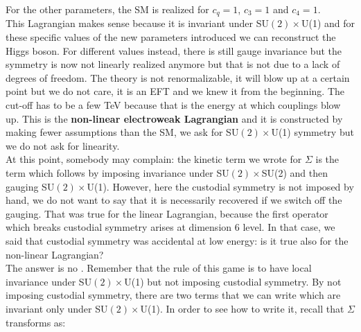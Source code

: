 \documentclass[../main.tex]{subfiles}
\begin{document}
For the other parameters, the SM is realized for $c_q=1$, $c_3=1$ and $c_4=1$.\\
This Lagrangian makes sense because it is invariant under SU$(2)\times$U(1) and for these specific values of the new parameters introduced we can reconstruct the Higgs boson. For different values instead, there is still gauge invariance but the symmetry is now not linearly realized anymore but that is not due to a lack of degrees of freedom. The theory is not renormalizable, it will blow up at a certain point but we do not care, it is an EFT and we knew it from the beginning. The cut-off has to be a few TeV because that is the energy at which couplings blow up. This is the \textbf{non-linear electroweak Lagrangian} and it is constructed by making fewer assumptions than the SM, we ask for SU$(2)\times$U(1) symmetry but we do not ask for linearity.\\
At this point, somebody may complain: the kinetic term we wrote for $\Sigma$ is the term which follows by imposing invariance under SU$(2)\times$SU(2) and then gauging SU$(2)\times$U(1). However, here the custodial symmetry is not imposed by hand, we do not want to say that it is necessarily recovered if we switch off the gauging. That was true for the linear Lagrangian, because the first operator which breaks custodial symmetry arises at dimension 6 level. In that case, we said that custodial symmetry was accidental at low energy: is it true also for the non-linear Lagrangian?\\
The answer is no . Remember that the rule of this game is to have local invariance under SU$(2)\times$U(1) but not imposing custodial symmetry. By not imposing custodial symmetry, there are two terms that we can write which are invariant only under SU$(2)\times$U(1). In order to see how to write it, recall that $\Sigma$ transforms as:
\end{document}
